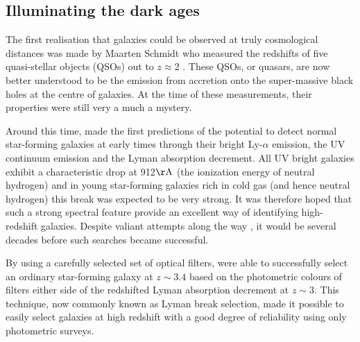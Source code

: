 \subsection{Illuminating the dark ages}\label{sec:intro-distant-galaxies}
The first realisation that galaxies could be observed at truly cosmological distances was made by Maarten Schmidt who measured the redshifts of five quasi-stellar objects (QSOs) out to $z\approx 2$ \citep{Schmidt:1965gm}. These QSOs, or quasars, are now better understood to be the emission from accretion onto the super-massive black holes at the centre of galaxies. At the time of these measurements, their properties were still very a much a mystery. 

Around this time, \citet{Partridge:1967iw} made the first predictions of the potential to detect normal star-forming galaxies at early times through their bright Ly-$\alpha$ emission, the UV continuum emission and the Lyman absorption decrement. All UV bright galaxies exhibit a characteristic drop at 912$\rm{\AA}$ (the ionization energy of neutral hydrogen) and in young star-forming galaxies rich in cold gas (and hence neutral hydrogen) this break was expected to be very strong. It was therefore hoped that such a strong spectral feature provide an excellent way of identifying high-redshift galaxies. Despite valiant attempts along the way \citep{Meier:1976ch}, it would be several decades before such searches became successful. 

By using a carefully selected set of optical filters, \citet{1992AJ....104..941S} were able to successfully select an ordinary star-forming galaxy at $z\sim 3.4$ based on the photometric colours of filters either side of the redshifted Lyman absorption decrement at $z\sim3$. This technique, now commonly known as Lyman break selection, made it possible to easily select galaxies at high redshift with a good degree of reliability using only photometric surveys. 

